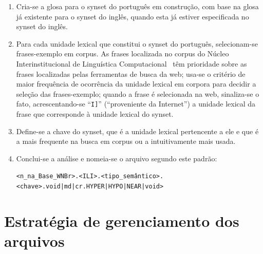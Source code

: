 \begin{enumerate}
  \item Cria-se a glosa para o synset do português em construção, com base na
    glosa já existente para o synset do inglês, quando esta já estiver
    especificada no synset do inglês.

  \item Para cada unidade lexical que constitui o synset do português,
    selecionam-se frases-exemplo em corpus. As frases localizada no corpus do
    Núcleo Interinstitucional de Linguística Computacional~\cite{nilc} têm
    prioridade sobre as frases localizadas pelas ferramentas de busca da web;
    usa-se o critério de maior frequência de ocorrência da unidade lexical em
    corpora para decidir a seleção das frases-exemplo; quando a frase é selecionada
  na web, sinaliza-se o fato, acrescentando-se ``\texttt{I]}'' (``proveniente da
  Internet'') a unidade lexical da frase que corresponde à unidade lexical do
  synset.

\item Define-se a chave do synset, que é a unidade lexical pertencente a ele e
  que é a mais frequente na busca em corpus ou a intuitivamente mais usada.

\item Conclui-se a análise e nomeia-se o arquivo segundo este padrão:

  \begin{center}
    \texttt{<n\textordmasculine\_na\_Base\_WNBr>.<ILI>.<tipo\_semântico>.
    <chave>.void|md|cr.HYPER|HYPO|NEAR|void>}
  \end{center}

\end{enumerate}

\section{Estratégia de gerenciamento dos arquivos}

% 

